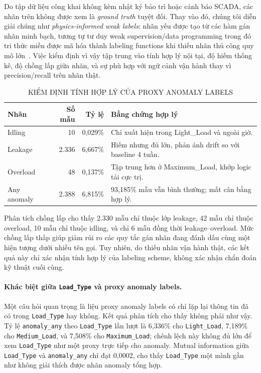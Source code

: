 \documentclass[conference]{IEEEtran}
\begin{document}
Do tập dữ liệu công khai không kèm nhật ký bảo trì hoặc cảnh báo SCADA, các nhãn trên
không được xem là \textit{ground truth} tuyệt đối. Thay vào đó, chúng tôi diễn giải
chúng như \textit{physics-informed weak labels}: nhãn yếu được tạo từ các hàm gán nhãn
minh bạch, tương tự tư duy weak supervision/data programming trong đó tri thức miền
được mã hóa thành labeling functions khi thiếu nhãn thủ công quy mô lớn~\cite{ratner2016data,ratner2017snorkel}.
Việc kiểm định vì vậy tập trung vào tính hợp lý nội tại, độ hiếm thống kê, độ chồng lấp
giữa nhãn, và sự phù hợp với ngữ cảnh vận hành thay vì precision/recall trên nhãn thật.

\begin{table}[htbp]
\caption{KIỂM ĐỊNH TÍNH HỢP LÝ CỦA PROXY ANOMALY LABELS}
\label{tab:proxy_validation}
\centering
\small
\begin{tabular}{@{}lrrp{3.2cm}@{}}
\toprule
Nhãn & Số mẫu & Tỷ lệ & Bằng chứng hợp lý \\
\midrule
Idling & 10 & 0,029\% & Chỉ xuất hiện trong Light\_Load và ngoài giờ. \\
Leakage & 2.336 & 6,667\% & Hiếm nhưng đủ lớn, phản ánh drift so với baseline 4 tuần. \\
Overload & 48 & 0,137\% & Tập trung hơn ở Maximum\_Load, khớp logic tải cực trị. \\
Any anomaly & 2.388 & 6,815\% & 93,185\% mẫu vẫn bình thường; mất cân bằng hợp lý. \\
\bottomrule
\end{tabular}
\end{table}

Phân tích chồng lấp cho thấy 2.330 mẫu chỉ thuộc lớp leakage, 42 mẫu chỉ thuộc overload,
10 mẫu chỉ thuộc idling, và chỉ 6 mẫu đồng thời leakage--overload. Mức chồng lấp thấp
giúp giảm rủi ro các quy tắc gán nhãn đang đánh dấu cùng một hiện tượng dưới nhiều tên gọi.
Tuy nhiên, do thiếu nhãn vận hành thật, các kết quả này chỉ xác nhận tính hợp lý của
labeling scheme, không xác nhận chẩn đoán kỹ thuật cuối cùng.

\paragraph{Khác biệt giữa \texttt{Load\_Type} và proxy anomaly labels.}
Một câu hỏi quan trọng là liệu proxy anomaly labels có chỉ lặp lại thông tin đã có trong
\texttt{Load\_Type} hay không. Kết quả phân tích cho thấy không phải như vậy.
Tỷ lệ \texttt{anomaly\_any} theo \texttt{Load\_Type} lần lượt là 6,336\% cho
\texttt{Light\_Load}, 7,189\% cho \texttt{Medium\_Load}, và 7,508\% cho
\texttt{Maximum\_Load}; chênh lệch này không đủ lớn để xem \texttt{Load\_Type}
như một proxy trực tiếp cho anomaly. Mutual information giữa \texttt{Load\_Type}
và \texttt{anomaly\_any} chỉ đạt 0,0002, cho thấy \texttt{Load\_Type} một mình
gần như không giải thích được nhãn anomaly tổng hợp.
\end{document}
